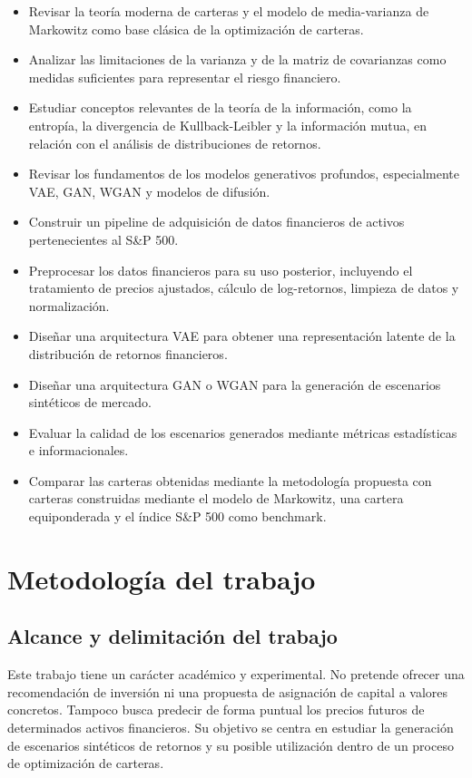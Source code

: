 \begin{itemize}
    \item Revisar la teoría moderna de carteras y el modelo de media-varianza de Markowitz como base clásica de la optimización de carteras.
    \item Analizar las limitaciones de la varianza y de la matriz de covarianzas como medidas suficientes para representar el riesgo financiero.
    \item Estudiar conceptos relevantes de la teoría de la información, como la entropía, la divergencia de Kullback-Leibler y la información mutua, en relación con el análisis de distribuciones de retornos.
    \item Revisar los fundamentos de los modelos generativos profundos, especialmente VAE, GAN, WGAN y modelos de difusión.
    \item Construir un pipeline de adquisición de datos financieros de activos pertenecientes al S\&P 500.
    \item Preprocesar los datos financieros para su uso posterior, incluyendo el tratamiento de precios ajustados, cálculo de log-retornos, limpieza de datos y normalización.
    \item Diseñar una arquitectura VAE para obtener una representación latente de la distribución de retornos financieros.
    \item Diseñar una arquitectura GAN o WGAN para la generación de escenarios sintéticos de mercado.
    \item Evaluar la calidad de los escenarios generados mediante métricas estadísticas e informacionales.
    \item Comparar las carteras obtenidas mediante la metodología propuesta con carteras construidas mediante el modelo de Markowitz, una cartera equiponderada y el índice S\&P 500 como benchmark.
\end{itemize}

\section{Metodología del trabajo}

\subsection{Alcance y delimitación del trabajo}

Este trabajo tiene un carácter académico y experimental. No pretende ofrecer una recomendación de inversión ni una propuesta de asignación de capital a valores concretos. Tampoco busca predecir de forma puntual los precios futuros de determinados activos financieros. Su objetivo se centra en estudiar la generación de escenarios sintéticos de retornos y su posible utilización dentro de un proceso de optimización de carteras.

